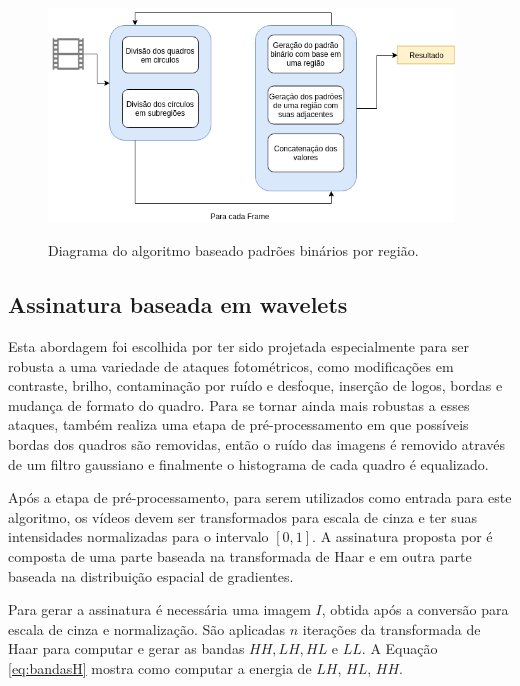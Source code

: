  \begin{figure}[h]
      \centering
      \caption{Diagrama do algoritmo baseado padrões binários por região.}
      \includegraphics[width=0.96\textwidth]{dados/figuras/RBP.png}
       	\label{fig:dia_rbp}
    \end{figure}  

    
%
%

\subsection{Assinatura baseada em wavelets}
\label{wavelets}

Esta abordagem foi escolhida por ter sido projetada especialmente para ser robusta a uma variedade de ataques fotométricos, como modificações em contraste, brilho, contaminação por ruído e desfoque, inserção de logos, bordas e mudança de formato do quadro. Para se tornar ainda mais robustas a esses ataques, \citeauthor{Dutta2013} também realiza uma etapa de pré-processamento em que possíveis bordas dos quadros são removidas, então o ruído das imagens é removido através de um filtro gaussiano e finalmente o histograma de cada quadro é equalizado. 

Após a etapa de pré-processamento, para serem utilizados como entrada para este algoritmo, os vídeos devem ser transformados para escala de cinza e ter suas intensidades normalizadas para o intervalo $[0,1]$. A assinatura proposta por \citeauthor{Dutta2013} é composta de uma parte baseada na transformada de Haar e em outra parte baseada na distribuição espacial de gradientes.

 Para gerar a assinatura é necessária uma imagem $I$, obtida após a conversão para escala de cinza e normalização. São aplicadas $n$ iterações da transformada de Haar para computar e gerar as bandas $HH, LH, HL$ e $LL$.  A Equação \ref{eq:bandasH} mostra como computar a energia de $LH$, $HL$, $HH$. 
 
